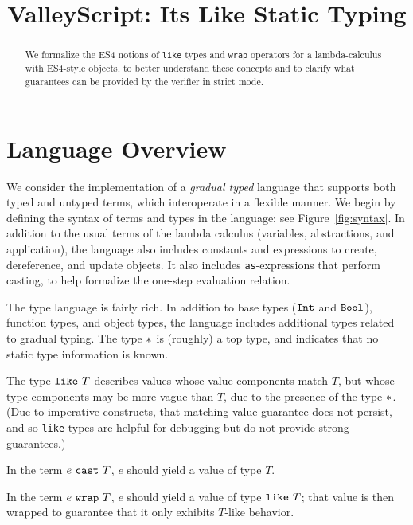 \documentclass{article}
\newcommand{\Int}{\t{Int}}
\newcommand{\Bool}{\t{Bool}}
\newcommand{\dynamic}{\t{*}}
\newcommand{\astype}[2]{#1~\t{cast}~#2}
\renewcommand{\t}[1]{{\tt #1}}
\newcommand{\likety}[1]{\t{like}~#1}
\newcommand{\wrap}[2]{#1~\t{wrap}~#2}
\begin{document}
\title{ValleyScript: Its Like Static Typing
}

\maketitle

\begin{abstract}
We formalize the ES4 notions of \t{like} types and \t{wrap} operators for a lambda-calculus with ES4-style objects,
to better understand these concepts and to clarify what guarantees can be provided by the verifier in strict mode.
\end{abstract}

\section{Language Overview}

We consider the implementation of a \emph{gradual typed} language that supports both
typed and untyped terms, which interoperate in a flexible manner.
We begin by defining the syntax of terms and types in the language: see Figure~\ref{fig:syntax}.
In addition to the usual terms of the lambda calculus (variables, abstractions, and application), 
the language also includes constants and expressions to create, dereference, and update objects.
It also includes \t{as}-expressions that perform casting, to help formalize the one-step evaluation relation.

The type language is fairly rich. In addition to  base types ($\Int$ and $\Bool$), function types,
and object types, the language includes additional types related to gradual typing.
The type $\dynamic$ is (roughly) a top type, and indicates that no static type information is known.

The type $\likety{T}$ describes values whose value components match $T$, but whose type components may be more vague than $T$, due to the presence of the type $\dynamic$. (Due to imperative constructs, that matching-value guarantee does not persist, and so \t{like} types are helpful for debugging but do not provide strong guarantees.)

In the term $\astype{e}{T}$, $e$ should yield a value of type ${T}$.

In the term $\wrap{e}{T}$, $e$ should yield a value of type $\likety{T}$;
that value is then wrapped to guarantee that it only exhibits $T$-like behavior.
\end{document}
